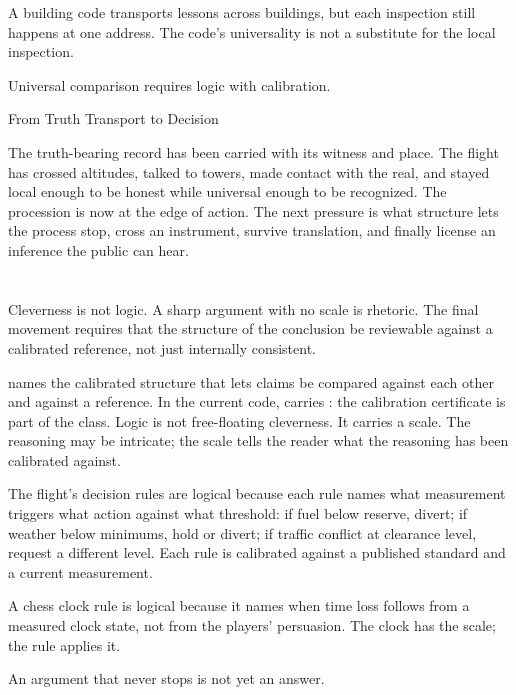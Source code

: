 A building code transports lessons across buildings, but each
inspection still happens at one address. The code's universality is
not a substitute for the local inspection.

Universal comparison requires logic with calibration.

\begin{movement}{From Truth Transport to Decision}

The truth-bearing record has been carried with its witness and place.
The flight has crossed altitudes, talked to towers, made contact with
the real, and stayed local enough to be honest while universal enough
to be recognized. The procession is now at the edge of action. The
next pressure is what structure lets the process stop, cross an
instrument, survive translation, and finally license an inference
the public can hear.

\end{movement}

\section{}
\label{se:logical}

Cleverness is not logic. A sharp argument with no scale is rhetoric.
The final movement requires that the structure of the conclusion be
reviewable against a calibrated reference, not just internally
consistent.

 names the calibrated structure that lets claims be
compared against each other and against a reference. In the current
code,  carries : the
calibration certificate is part of the class. Logic is not
free-floating cleverness. It carries a scale. The reasoning may be
intricate; the scale tells the reader what the reasoning has been
calibrated against.

The flight's decision rules are logical because each rule names what
measurement triggers what action against what threshold: if fuel below
reserve, divert; if weather below minimums, hold or divert; if traffic
conflict at clearance level, request a different level. Each rule is
calibrated against a published standard and a current measurement.

A chess clock rule is logical because it names when time loss follows
from a measured clock state, not from the players' persuasion. The
clock has the scale; the rule applies it.

An argument that never stops is not yet an answer.

